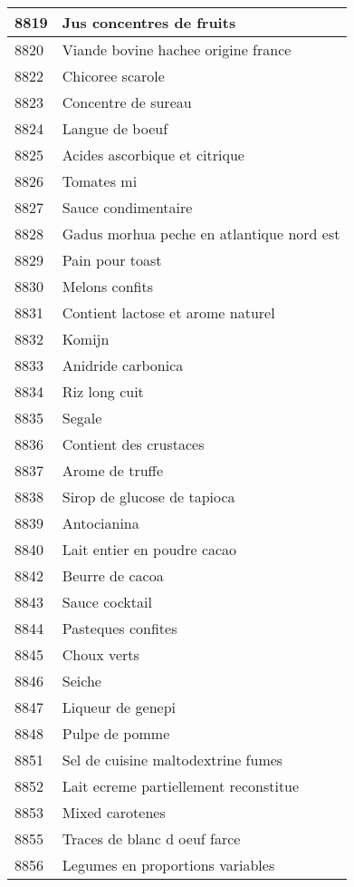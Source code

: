 \begin{longtable}{|l|l|}
8819 & Jus concentres de fruits \\ \hline 
8820 & Viande bovine hachee origine france \\ \hline 
8822 & Chicoree scarole \\ \hline 
8823 & Concentre de sureau \\ \hline 
8824 & Langue de boeuf \\ \hline 
8825 & Acides ascorbique et citrique \\ \hline 
8826 & Tomates mi \\ \hline 
8827 & Sauce condimentaire \\ \hline 
8828 & Gadus morhua peche en atlantique nord est \\ \hline 
8829 & Pain pour toast \\ \hline 
8830 & Melons confits \\ \hline 
8831 & Contient lactose et arome naturel \\ \hline 
8832 & Komijn \\ \hline 
8833 & Anidride carbonica \\ \hline 
8834 & Riz long cuit \\ \hline 
8835 & Segale \\ \hline 
8836 & Contient des crustaces \\ \hline 
8837 & Arome de truffe \\ \hline 
8838 & Sirop de glucose de tapioca \\ \hline 
8839 & Antocianina \\ \hline 
8840 & Lait entier en poudre cacao \\ \hline 
8842 & Beurre de cacoa \\ \hline 
8843 & Sauce cocktail \\ \hline 
8844 & Pasteques confites \\ \hline 
8845 & Choux verts \\ \hline 
8846 & Seiche \\ \hline 
8847 & Liqueur de genepi \\ \hline 
8848 & Pulpe de pomme \\ \hline 
8851 & Sel de cuisine maltodextrine fumes \\ \hline 
8852 & Lait ecreme partiellement reconstitue \\ \hline 
8853 & Mixed carotenes \\ \hline 
8855 & Traces de blanc d oeuf farce \\ \hline 
8856 & Legumes en proportions variables \\ \hline 

\end{longtable}
